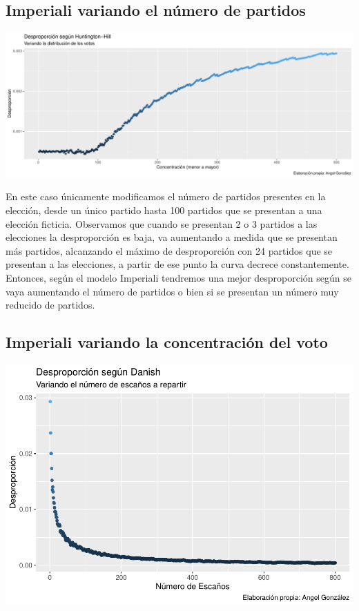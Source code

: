 \documentclass[12pt,a4paper,]{book}
\numberwithin{dummy}{section}
\theoremstyle{ocrenumbox}
\theoremstyle{blacknumex}
\theoremstyle{blacknumbox}
\theoremstyle{ocrenum}
\theoremstyle{ocrenum}
\begin{document}
\hypertarget{imperiali-variando-el-nuxfamero-de-partidos}{%
\subsection{Imperiali variando el número de
partidos}\label{imperiali-variando-el-nuxfamero-de-partidos}}

\begin{center}\includegraphics[width=0.95\linewidth]{figurasR/unnamed-chunk-34-1} \end{center}

En este caso únicamente modificamos el número de partidos presentes en
la elección, desde un único partido hasta 100 partidos que se presentan
a una elección ficticia. Observamos que cuando se presentan 2 o 3
partidos a las elecciones la desproporción es baja, va aumentando a
medida que se presentan más partidos, alcanzando el máximo de
desproporción con 24 partidos que se presentan a las elecciones, a
partir de ese punto la curva decrece constantemente. Entonces, según el
modelo Imperiali tendremos una mejor desproporción según se vaya
aumentando el número de partidos o bien si se presentan un número muy
reducido de partidos.

\hypertarget{imperiali-variando-la-concentraciuxf3n-del-voto}{%
\subsection{Imperiali variando la concentración del
voto}\label{imperiali-variando-la-concentraciuxf3n-del-voto}}

\begin{center}\includegraphics[width=0.95\linewidth]{figurasR/unnamed-chunk-35-1} \end{center}
\end{document}
